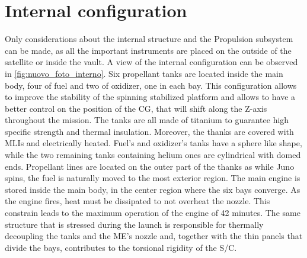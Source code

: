\section{Internal configuration}
\label{sec:internal_config}

Only considerations about the internal structure and the Propulsion subsystem can be made, as all the important instruments are placed on the outside of the satellite or inside the vault. A view of the internal configuration can be observed in \autoref{fig:nuovo_foto_interno}. Six propellant tanks are located inside the main body, four of fuel and two of oxidizer, one in each bay. This configuration allows to improve the stability of the spinning stabilized platform and allows to have a better control on the position of the CG, that will shift along the Z-axis throughout the mission. The tanks are all made of titanium to guarantee high specific strength and thermal insulation.\cite{LL_early_cruise} Moreover, the thanks are covered with MLIs and electrically heated. Fuel's and oxidizer's tanks have a sphere like shape, while the two remaining tanks containing helium ones are cylindrical with domed ends. Propellant lines are located on the outer part of the thanks as while Juno spins, the fuel is naturally moved to the most exterior region. The main engine is stored inside the main body, in the center region where the six bays converge.\cite{Leros}\cite{Juno_launch} As the engine fires, heat must be dissipated to not overheat the nozzle. This constrain leads to the maximum operation of the engine of 42 minutes.\cite{Leros} The same structure that is stressed during the launch is responsible for thermally decoupling the tanks and the ME's nozzle and, together with the thin panels that divide the bays, contributes to the torsional rigidity of the S/C. 

